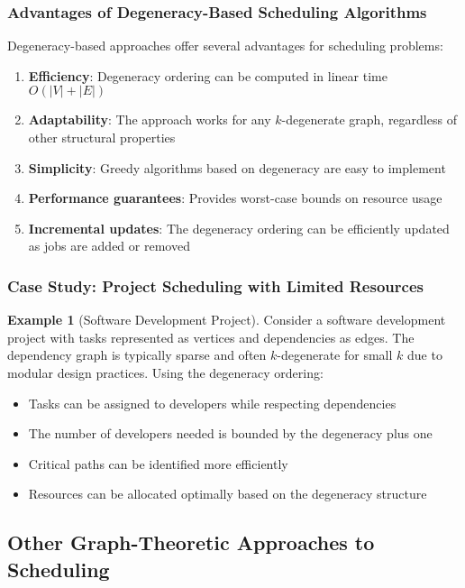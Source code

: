 \documentclass{article}
\theoremstyle{definition}
\newtheorem{example}{Example}
\begin{document}
\subsubsection*{Advantages of Degeneracy-Based Scheduling Algorithms}

Degeneracy-based approaches offer several advantages for scheduling problems:

\begin{enumerate}
    \item \textbf{Efficiency}: Degeneracy ordering can be computed in linear time $O(|V| + |E|)$
    \item \textbf{Adaptability}: The approach works for any $k$-degenerate graph, regardless of other structural properties
    \item \textbf{Simplicity}: Greedy algorithms based on degeneracy are easy to implement
    \item \textbf{Performance guarantees}: Provides worst-case bounds on resource usage
    \item \textbf{Incremental updates}: The degeneracy ordering can be efficiently updated as jobs are added or removed
\end{enumerate}

\subsubsection*{Case Study: Project Scheduling with Limited Resources}

\begin{example}[Software Development Project]
Consider a software development project with tasks represented as vertices and dependencies as edges. The dependency graph is typically sparse and often $k$-degenerate for small $k$ due to modular design practices. Using the degeneracy ordering:

\begin{itemize}
    \item Tasks can be assigned to developers while respecting dependencies
    \item The number of developers needed is bounded by the degeneracy plus one
    \item Critical paths can be identified more efficiently
    \item Resources can be allocated optimally based on the degeneracy structure
\end{itemize}
\end{example}
\subsection*{Other Graph-Theoretic Approaches to Scheduling}
\end{document}

